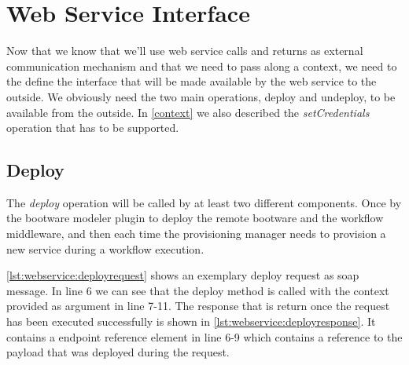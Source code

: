 \section{Web Service Interface}

Now that we know that we'll use web service calls and returns as external communication mechanism and that we need to pass along a context, we need to the define the interface that will be made available by the web service to the outside.
We obviously need the two main operations, deploy and undeploy, to be available from the outside.
In \autoref{context} we also described the \textit{setCredentials} operation that has to be supported.

\subsection{Deploy}

The \textit{deploy} operation will be called by at least two different components.
Once by the bootware modeler plugin to deploy the remote bootware and the workflow middleware, and then each time the provisioning manager needs to provision a new service during a workflow execution.

\vspace*{\baselineskip}

\autoref{lst:webservice:deployrequest} shows an exemplary deploy request as soap message.
In line 6 we can see that the deploy method is called with the context provided as argument in line 7-11.
The response that is return once the request has been executed successfully is shown in \autoref{lst:webservice:deployresponse}.
It contains a endpoint reference element in line 6-9 which contains a reference to the payload that was deployed during the request.

\vspace*{\baselineskip}

